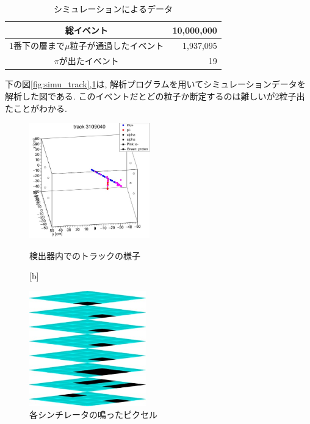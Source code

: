 \begin{table}[H]
    \centering
    \caption{シミュレーションによるデータ}
    \label{tab:simu_data}
    \begin{tabular}{|c|r|}
        \hline
        総イベント & 10,000,000    \\ \hline
        1番下の層まで$\mu$粒子が通過したイベント       & 1,937,095 \\ \hline
        $\pi$が出たイベント     & 19  \\ \hline
    \end{tabular}
\end{table}

下の図\ref{fig:simu_track},\ref{fig:simu_pixel}は, 解析プログラムを用いてシミュレーションデータを解析した図である.
このイベントだとどの粒子か断定するのは難しいが2粒子出たことがわかる.
\begin{figure}[H]
    \begin{minipage}[b]{0.47\linewidth}
        \centering
        \includegraphics[height=5cm]{img/track_pion.jpg}
        \caption{検出器内でのトラックの様子}
        \label{fig:simu_track}
    \end{minipage}[b]
    \begin{minipage}[b]{0.47\linewidth}
        \centering
        \includegraphics[height=5cm]{img/track_simulation.jpg}
        \caption{各シンチレータの鳴ったピクセル}
        \label{fig:simu_pixel}
    \end{minipage}
\end{figure}
        
